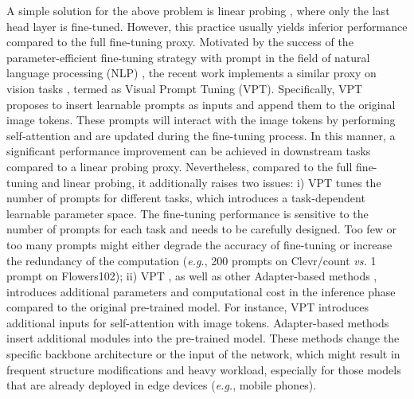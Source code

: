 A simple solution for the above problem is linear probing \cite{he2020momentum}, where only the last head layer is fine-tuned. However, this practice usually yields inferior performance compared to the full fine-tuning proxy. Motivated by the success of the parameter-efficient fine-tuning strategy with prompt in the field of natural language processing (NLP) \cite{houlsby2019parameter,li2021prefix,hu2021lora,he2022parameter}, the recent work implements a similar proxy on vision tasks \cite{jia2022visual}, termed as Visual Prompt Tuning (VPT). Specifically, VPT \cite{jia2022visual} proposes to insert learnable prompts as inputs and append them to the original image tokens. These prompts will interact with the image tokens by performing self-attention and are updated during the fine-tuning process. In this manner, a significant performance improvement can be achieved in downstream tasks compared to a linear probing proxy. Nevertheless, compared to the full fine-tuning and linear probing, it additionally raises two issues: i) VPT tunes the number of prompts for different tasks, which introduces a task-dependent learnable parameter space. The fine-tuning performance is sensitive to the number of prompts for each task and needs to be carefully designed. Too few or too many prompts might either degrade the accuracy of fine-tuning or increase the redundancy of the computation (\emph{e.g.}, 200 prompts on Clevr/count \emph{vs.} 1 prompt on Flowers102); ii) VPT \cite{jia2022visual}, as well as other Adapter-based methods \cite{houlsby2019parameter, mahabadi2021compacter}, introduces additional parameters and computational cost in the inference phase compared to the original pre-trained model. For instance, VPT introduces additional inputs for self-attention with image tokens. Adapter-based methods insert additional modules into the pre-trained model. These methods change the specific backbone architecture or the input of the network, which might result in frequent structure modifications and heavy workload, especially for those models that are already deployed in edge devices (\emph{e.g.}, mobile phones).

